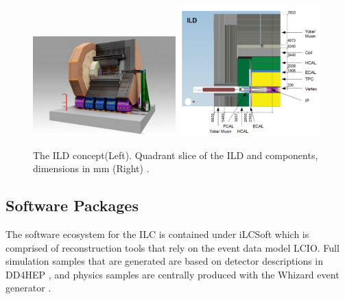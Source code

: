 \begin{figure}

\includegraphics[width=0.49\textwidth]{ild3d.pdf}
\includegraphics[width=0.49\textwidth]{ildxsec.pdf}
\caption{The ILD concept(Left). Quadrant slice of the ILD and components, dimensions in mm (Right) \cite{tdrdet}.}
\label{fig:ilddet}
\end{figure}
\subsection{Software Packages}
\label{ilcsoft}

The software ecosystem for the ILC is contained under iLCSoft \cite{ilcsoft} which is comprised of reconstruction tools that rely on the event data model LCIO\cite{lcio}. Full simulation samples that are generated are based on detector descriptions in DD4HEP \cite{dd4hep}, and physics samples are centrally produced with the Whizard event generator \cite{ whizard}.


